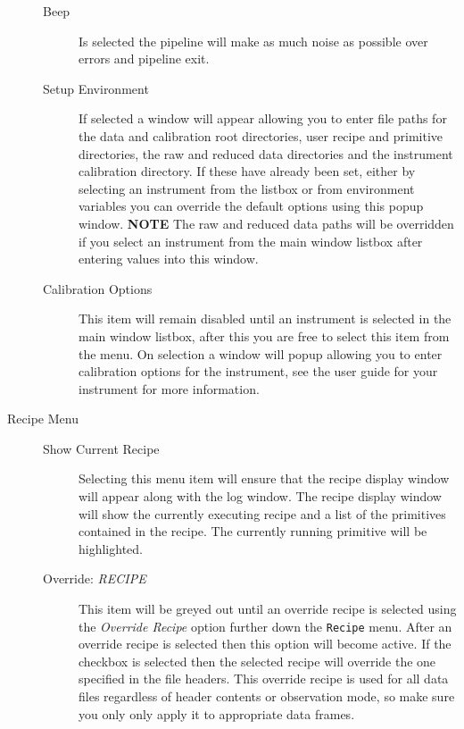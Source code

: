 \documentclass[twoside,11pt]{article}
\renewcommand{\_}{\texttt{\symbol{95}}}
\begin{document}
\begin{description}
\begin{description}
\item[Beep] \mbox{}

Is selected the pipeline will make as much noise as possible over
errors and pipeline exit.


\item[Setup Environment] \mbox{}

If selected a window will appear allowing you to enter file paths for
the data and calibration root directories, user recipe and primitive
directories, the raw and reduced data directories and the instrument
calibration directory. If these have already been set, either by
selecting an instrument from the listbox or from environment variables
you can override the default options using this popup window. \textbf{NOTE}
The raw and reduced data paths will be overridden if you select an
instrument from the main window listbox after entering values into
this window.


\item[Calibration Options] \mbox{}

This item will remain disabled until an instrument is selected in the
main window listbox, after this you are free to select this item from
the menu. On selection a window will popup allowing you to enter
calibration options for the instrument, see the user guide for your
instrument for more information.

\end{description}

\item[Recipe Menu] \mbox{}\begin{description}

\item[Show Current Recipe] \mbox{}

Selecting this menu item will ensure that the recipe display window
will appear along with the log window. The recipe display window will
show the currently executing recipe and a list of the primitives
contained in the recipe. The currently running primitive will be
highlighted.


\item[Override: \textit{RECIPE}] \mbox{}

This item will be greyed out until an override recipe is selected
using the \textit{Override Recipe} option further down the \texttt{Recipe}
menu. After an override recipe is selected then this option will
become active. If the checkbox is selected then the selected recipe
will override the one specified in the file headers. This override
recipe is used for all data files regardless of header contents or
observation mode, so make sure you only only apply it to appropriate
data frames.



\end{description}
\end{description}
\end{document}
